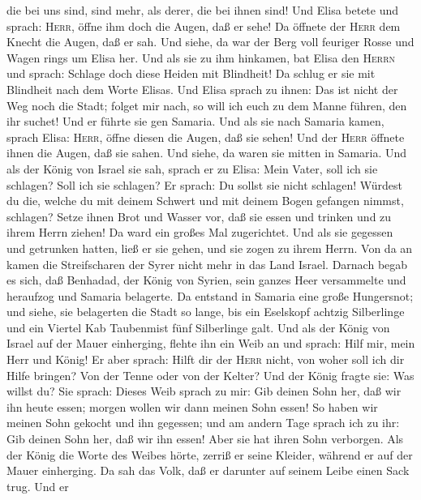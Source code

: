 die bei uns sind, sind mehr, als derer, die bei ihnen sind!
 Und Elisa betete und sprach: \textsc{Herr}, öffne ihm
doch die Augen, daß er sehe! Da öffnete der \textsc{Herr} dem Knecht die
Augen, daß er sah. Und siehe, da war der Berg voll feuriger Rosse und
Wagen rings um Elisa her.  Und als sie zu ihm hinkamen,
bat Elisa den \textsc{Herrn} und sprach: Schlage doch diese Heiden mit
Blindheit! Da schlug er sie mit Blindheit nach dem Worte Elisas.
 Und Elisa sprach zu ihnen: Das ist nicht der Weg noch
die Stadt; folget mir nach, so will ich euch zu dem Manne führen, den
ihr suchet! Und er führte sie gen Samaria.  Und als sie
nach Samaria kamen, sprach Elisa: \textsc{Herr}, öffne diesen die Augen,
daß sie sehen! Und der \textsc{Herr} öffnete ihnen die Augen, daß sie
sahen. Und siehe, da waren sie mitten in Samaria.  Und
als der König von Israel sie sah, sprach er zu Elisa: Mein Vater, soll
ich sie schlagen? Soll ich sie schlagen?  Er sprach: Du
sollst sie nicht schlagen! Würdest du die, welche du mit deinem Schwert
und mit deinem Bogen gefangen nimmst, schlagen? Setze ihnen Brot und
Wasser vor, daß sie essen und trinken und zu ihrem Herrn ziehen!
 Da ward ein großes Mal zugerichtet. Und als sie gegessen
und getrunken hatten, ließ er sie gehen, und sie zogen zu ihrem Herrn.
Von da an kamen die Streifscharen der Syrer nicht mehr in das Land
Israel.  Darnach begab es sich, daß Benhadad, der König
von Syrien, sein ganzes Heer versammelte und heraufzog und Samaria
belagerte.  Da entstand in Samaria eine große Hungersnot;
und siehe, sie belagerten die Stadt so lange, bis ein Eselskopf achtzig
Silberlinge und ein Viertel Kab Taubenmist fünf Silberlinge galt.
 Und als der König von Israel auf der Mauer einherging,
flehte ihn ein Weib an und sprach: Hilf mir, mein Herr und König!
 Er aber sprach: Hilft dir der \textsc{Herr} nicht, von
woher soll ich dir Hilfe bringen?  Von der Tenne oder von
der Kelter? Und der König fragte sie: Was willst du? Sie sprach: Dieses
Weib sprach zu mir: Gib deinen Sohn her, daß wir ihn heute essen; morgen
wollen wir dann meinen Sohn essen!  So haben wir meinen
Sohn gekocht und ihn gegessen; und am andern Tage sprach ich zu ihr: Gib
deinen Sohn her, daß wir ihn essen! Aber sie hat ihren Sohn verborgen.
 Als der König die Worte des Weibes hörte, zerriß er
seine Kleider, während er auf der Mauer einherging. Da sah das Volk, daß
er darunter auf seinem Leibe einen Sack trug.  Und er
